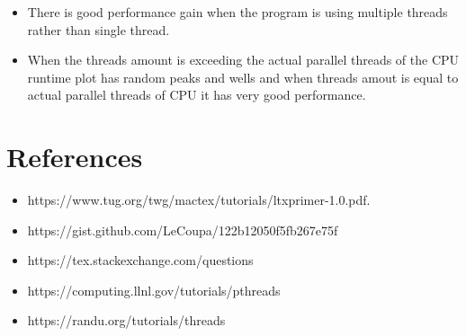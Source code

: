 \documentclass[12pt, a4paper]{article}
\begin{document}
	\begin{itemize}

		\item There is good performance gain when the program is using multiple threads rather than single thread.

		\item When the threads amount is exceeding the actual parallel threads of the CPU runtime plot has random peaks and wells and when threads amout is equal to actual parallel threads of CPU it has very good performance.


	\end{itemize}

	\newpage


	\section{References}

	\begin{itemize}
	  \item https://www.tug.org/twg/mactex/tutorials/ltxprimer-1.0.pdf.
	  \item https://gist.github.com/LeCoupa/122b12050f5fb267e75f
	  \item https://tex.stackexchange.com/questions
	  \item https://computing.llnl.gov/tutorials/pthreads
	  \item https://randu.org/tutorials/threads
	\end{itemize}
\end{document}
